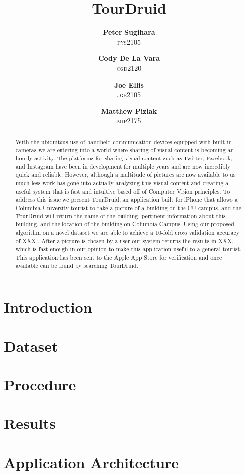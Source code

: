 \documentclass[twocolumn]{article}
\title{TourDruid}
\author{\textbf{Peter Sugihara}\\ \textsc{pys2105}
\and \textbf{Cody De La Vara}\\ \textsc{cgd2120}
\and \textbf{Joe Ellis}\\ \textsc{jge2105}
\and \textbf{Matthew Piziak}\\ \textsc{mjp2175}}
\newcommand{\sectionfile}[3]{\section{#1} \label{sec:#2} }
\begin{document}
\maketitle

\begin{abstract}

With the ubiquitous use of handheld communication devices equipped with built in cameras we are entering into a world where sharing of visual content is becoming an hourly activity.
The platforms for sharing visual content such as Twitter, Facebook, and Instagram have been in development for multiple years and are now incredibly quick and reliable.
However, although a multitude of pictures are now available to us much less work has gone into actually analyzing this visual content and creating a useful system that is fast and intuitive based off of Computer Vision principles.
To address this issue we present TourDruid, an application built for iPhone that allows a Columbia University tourist to take a picture of a building on the CU campus, and the TourDruid will return the name of the building, pertinent information about this building, and the location of the building on Columbia Campus.
Using our proposed algorithm on a novel dataset we are able to achieve a 10-fold cross validation accuracy of {\color{red} XXX }.  
After a picture is chosen by a user our system returns the results in {\color{red} XXX}, which is fast enough in our opinion to make this application useful to a general tourist.
This application has been sent to the Apple App Store for verification and once available can be found by searching TourDruid.

\end{abstract}


\newpage

\sectionfile{Introduction}{introduction}{introduction.tex}

\sectionfile{Dataset}{dataset}{dataset.tex}

\sectionfile{Procedure}{procedure}{procedure.tex}

\sectionfile{Results}{results}{results.tex}

\sectionfile{Application Architecture}{application_architecture}{application_architecture.tex}

\nocite{*}
{\small


}
\end{document}
